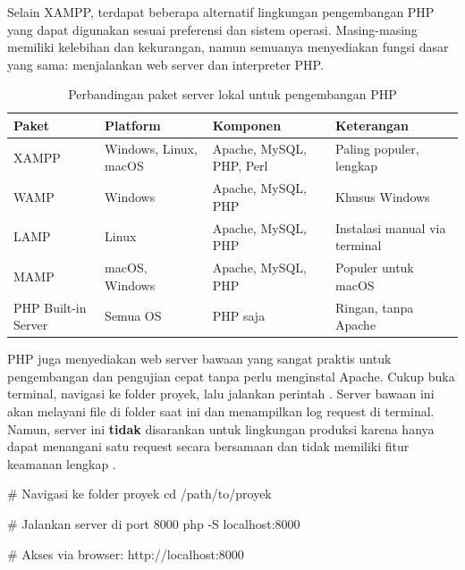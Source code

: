 Selain XAMPP, terdapat beberapa alternatif lingkungan pengembangan PHP yang dapat digunakan sesuai preferensi dan sistem operasi. Masing-masing memiliki kelebihan dan kekurangan, namun semuanya menyediakan fungsi dasar yang sama: menjalankan web server dan interpreter PHP.

\begin{table}[H]
\centering
\begin{tabular}{|P{2.5cm}|P{2.5cm}|P{4cm}|P{3cm}|}
\hline
\textbf{Paket} & \textbf{Platform} & \textbf{Komponen} & \textbf{Keterangan} \\
\hline
XAMPP & Windows, Linux, macOS & Apache, MySQL, PHP, Perl & Paling populer, lengkap \\
\hline
WAMP & Windows & Apache, MySQL, PHP & Khusus Windows \\
\hline
LAMP & Linux & Apache, MySQL, PHP & Instalasi manual via terminal \\
\hline
MAMP & macOS, Windows & Apache, MySQL, PHP & Populer untuk macOS \\
\hline
PHP Built-in Server & Semua OS & PHP saja & Ringan, tanpa Apache \\
\hline
\end{tabular}
\caption{Perbandingan paket server lokal untuk pengembangan PHP}
\end{table}

PHP juga menyediakan web server bawaan yang sangat praktis untuk pengembangan dan pengujian cepat tanpa perlu menginstal Apache. Cukup buka terminal, navigasi ke folder proyek, lalu jalankan perintah . Server bawaan ini akan melayani file di folder saat ini dan menampilkan log request di terminal. Namun, server ini \textbf{tidak} disarankan untuk lingkungan produksi karena hanya dapat menangani satu request secara bersamaan dan tidak memiliki fitur keamanan lengkap \cite{phpRightWay}.

\begin{webcode}[language=Bash, caption={Menjalankan PHP built-in server}]
# Navigasi ke folder proyek
cd /path/to/proyek

# Jalankan server di port 8000
php -S localhost:8000

# Akses via browser: http://localhost:8000
\end{webcode}


